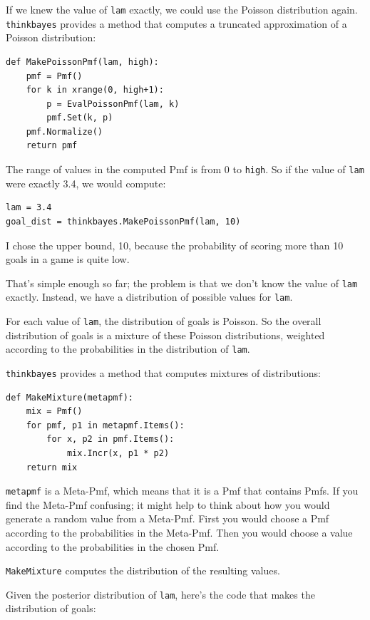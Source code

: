 \documentclass[12pt]{book}
\begin{document}
If we knew the value of {\tt lam} exactly, we could use the
Poisson distribution again.  \verb"thinkbayes" provides a
method that computes a truncated approximation of a Poisson
distribution:

\begin{verbatim}
def MakePoissonPmf(lam, high):
    pmf = Pmf()
    for k in xrange(0, high+1):
        p = EvalPoissonPmf(lam, k)
        pmf.Set(k, p)
    pmf.Normalize()
    return pmf
\end{verbatim}  

The range of values in the computed Pmf is from 0 to {\tt high}.
So if the value of {\tt lam} were exactly 3.4, we would compute:

\begin{verbatim}
lam = 3.4
goal_dist = thinkbayes.MakePoissonPmf(lam, 10)
\end{verbatim}

I chose the upper bound, 10, because the probability of scoring
more than 10 goals in a game is quite low.

That's simple enough so far; the problem is that we don't know
the value of {\tt lam} exactly.  Instead, we have a distribution
of possible values for {\tt lam}.

For each value of {\tt lam}, the distribution of goals is Poisson.
So the overall distribution of goals is a mixture of these
Poisson distributions, weighted according to the probabilities
in the distribution of {\tt lam}.

\verb"thinkbayes" provides a method that computes mixtures
of distributions:

\begin{verbatim}
def MakeMixture(metapmf):
    mix = Pmf()
    for pmf, p1 in metapmf.Items():
        for x, p2 in pmf.Items():
            mix.Incr(x, p1 * p2)
    return mix
\end{verbatim}  

{\tt metapmf} is a Meta-Pmf, which means that it is a Pmf that
contains Pmfs.  If you find the Meta-Pmf confusing; it might
help to think about how you would generate a random value from
a Meta-Pmf.  First you would choose a Pmf according to the
probabilities in the Meta-Pmf.  Then you would choose a value
according to the probabilities in the chosen Pmf.

\verb"MakeMixture" computes the distribution of the resulting
values.

Given the posterior distribution of {\tt lam}, here's the code
that makes the distribution of goals:
\end{document}
